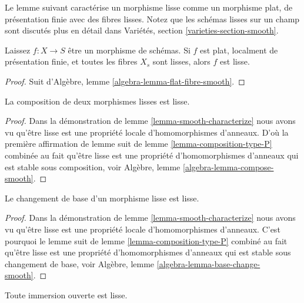 \noindent
Le lemme suivant caractérise un morphisme lisse comme un morphisme plat, de présentation finie avec des fibres lisses. Notez que les schémas lisses sur un champ sont discutés plus en détail dans Variétés, section \ref{varieties-section-smooth}.

\begin{lemma}

\label{lemma-smooth-flat-smooth-fibres}
Laissez $f : X \to S$ être un morphisme de schémas. Si $f$ est plat, localment de présentation finie, et toutes les fibres $X_s$ sont lisses, alors $f$ est lisse.
\end{lemma}

\begin{proof}
Suit d'Algèbre, lemme \ref{algebra-lemma-flat-fibre-smooth}.
\end{proof}

\begin{lemma}

\label{lemma-composition-smooth}

La composition de deux morphismes lisses est lisse.

\end{lemma}

\begin{proof}
Dans la démonstration de lemme \ref{lemma-smooth-characterize} nous avons vu qu'être lisse est une propriété locale d'homomorphismes d'anneaux. D'où la première affirmation de lemme suit de lemme \ref{lemma-composition-type-P} combinée au fait qu'être lisse est une propriété d'homomorphismes d'anneaux qui est stable sous composition, voir Algèbre, lemme \ref{algebra-lemma-compose-smooth}.
\end{proof}

\begin{lemma}

\label{lemma-base-change-smooth}
Le changement de base d'un morphisme lisse est lisse.
\end{lemma}

\begin{proof}
Dans la démonstration de lemme \ref{lemma-smooth-characterize} nous avons vu qu'être lisse est une propriété locale d'homomorphismes d'anneaux. C'est pourquoi le lemme suit de lemme \ref{lemma-composition-type-P} combiné au fait qu'être lisse est une propriété d'homomorphismes d'anneaux qui est stable sous changement de base, voir Algèbre, lemme \ref{algebra-lemma-base-change-smooth}.
\end{proof}

\begin{lemma}

\label{lemma-open-immersion-smooth}

Toute immersion ouverte est lisse.

\end{lemma}

